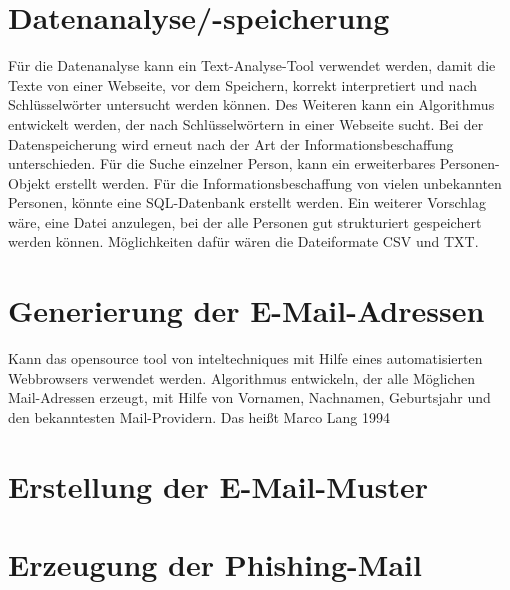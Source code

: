 \section{Datenanalyse/-speicherung}
Für die Datenanalyse kann ein Text-Analyse-Tool verwendet werden, damit die Texte von einer Webseite, vor dem Speichern, korrekt interpretiert und nach Schlüsselwörter untersucht werden können. Des Weiteren kann ein Algorithmus entwickelt werden, der nach Schlüsselwörtern in einer Webseite sucht.%
Bei der Datenspeicherung wird erneut nach der Art der Informationsbeschaffung unterschieden. Für die Suche einzelner Person, kann ein erweiterbares Personen-Objekt erstellt werden. Für die Informationsbeschaffung von vielen unbekannten Personen, könnte eine SQL-Datenbank erstellt werden. Ein weiterer Vorschlag wäre, eine Datei anzulegen, bei der alle Personen gut strukturiert gespeichert werden können. Möglichkeiten dafür wären die Dateiformate CSV und TXT.

\section{Generierung der E-Mail-Adressen}
Kann das opensource tool von inteltechniques mit Hilfe eines automatisierten Webbrowsers verwendet werden. Algorithmus entwickeln, der alle Möglichen Mail-Adressen erzeugt, mit Hilfe von Vornamen, Nachnamen, Geburtsjahr und den bekanntesten Mail-Providern. Das heißt Marco Lang 1994 

\section{Erstellung der E-Mail-Muster}

\section{Erzeugung der Phishing-Mail}
